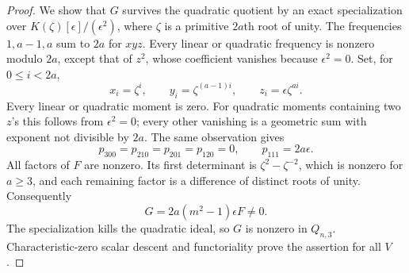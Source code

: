 \begin{proof}
We show that $G$ survives the quadratic quotient by an exact
specialization over $K(\zeta)[\epsilon]/(\epsilon^2)$, where $\zeta$
is a primitive $2a$th root of unity. The frequencies $1,a-1,a$
sum to $2a$ for $xyz$. Every linear or quadratic frequency is
nonzero modulo $2a$, except that of $z^2$, whose coefficient
vanishes because $\epsilon^2=0$.
Set, for $0\le i<2a$,
\[
 x_i=\zeta^i,\qquad y_i=\zeta^{(a-1)i},\qquad
 z_i=\epsilon\zeta^{ai}.
\]
Every linear or quadratic moment is zero. For quadratic moments
containing two $z$'s this follows from $\epsilon^2=0$; every other
vanishing is a geometric sum with exponent not divisible by $2a$.
The same observation gives
\[
 p_{300}=p_{210}=p_{201}=p_{120}=0,
                      \qquad p_{111}=2a\epsilon.
\]
All factors of $F$ are nonzero. Its first determinant is
$\zeta^2-\zeta^{-2}$, which is nonzero for $a\ge3$, and each
remaining factor is a difference of distinct roots of unity.
Consequently
\[
                           G=2a(m^2-1)\epsilon F\ne0.
\]
The specialization kills the quadratic ideal, so $G$ is nonzero
in $Q_{n,3}$. Characteristic-zero scalar descent and functoriality
prove the assertion for all $V$.
\end{proof}

